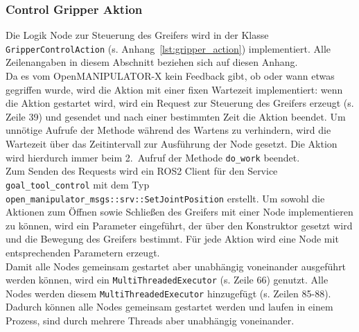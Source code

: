 \subsubsection{Control Gripper Aktion}
Die Logik Node zur Steuerung des Greifers wird in der Klasse \verb|GripperControlAction| (s. Anhang~\ref{lst:gripper_action}) implementiert.
Alle Zeilenangaben in diesem Abschnitt beziehen sich auf diesen Anhang.\\
Da es vom OpenMANIPULATOR-X kein Feedback gibt, ob oder wann etwas gegriffen wurde, wird die Aktion mit einer fixen Wartezeit implementiert: wenn die Aktion gestartet wird, wird ein Request zur Steuerung des Greifers erzeugt (s. Zeile 39) und gesendet und nach einer bestimmten Zeit die Aktion beendet.
Um unnötige Aufrufe der Methode während des Wartens zu verhindern, wird die Wartezeit über das Zeitintervall zur Ausführung der Node gesetzt.
Die Aktion wird hierdurch immer beim 2.\ Aufruf der Methode \verb|do_work| beendet.\\
Zum Senden des Requests wird ein \ac{ROS2} Client für den Service \verb|goal_tool_control| mit dem Typ \verb|open_manipulator_msgs::srv::SetJointPosition| erstellt. 
Um sowohl die Aktionen zum Öffnen sowie Schließen des Greifers mit einer Node implementieren zu können, wird ein Parameter eingeführt, der über den Konstruktor gesetzt wird und die Bewegung des Greifers bestimmt.
Für jede Aktion wird eine Node mit entsprechenden Parametern erzeugt.\\
Damit alle Nodes gemeinsam gestartet aber unabhängig voneinander ausgeführt werden können, wird ein \verb|MultiThreadedExecutor| (s. Zeile 66) genutzt.
Alle Nodes werden diesem \verb|MultiThreadedExecutor| hinzugefügt (s. Zeilen 85-88).
Dadurch können alle Nodes gemeinsam gestartet werden und laufen in einem Prozess, sind durch mehrere Threads aber unabhängig voneinander.

